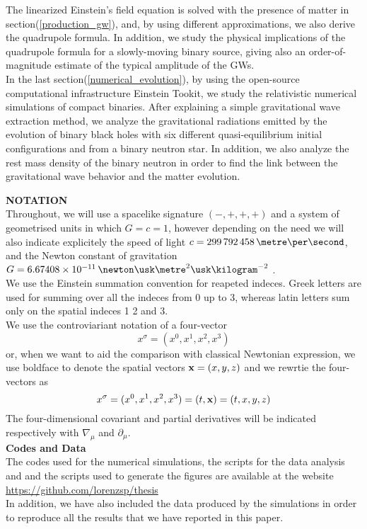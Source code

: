 The linearized Einstein's field equation is solved with the presence of matter in section(\ref{production_gw}), and, by using different approximations, we also derive the quadrupole formula. 
In addition, we study the physical implications of the quadrupole formula for a slowly-moving binary source, giving also an order-of-magnitude estimate of the typical amplitude of the GWs.\\
In the last section(\ref{numerical_evolution}), by using the open-source computational infrastructure Einstein Tookit\cite{loffler_einstein_2012}, we study the relativistic numerical simulations of compact binaries.
After explaining a simple gravitational wave extraction method, we analyze the gravitational radiations emitted by the evolution of binary black holes with six different quasi-equilibrium initial configurations and from a binary neutron star.
In addition, we also analyze the rest mass density of the binary neutron in order to find the link between the gravitational wave behavior and the matter evolution.

\textbf{NOTATION}\\
Throughout, we will use a spacelike signature $(-,+,+,+)$ and a system of geometrised units in which $G=c=1$, however depending on the need we will also indicate explicitely the speed of light $c=299\,792\,458 \,\metre \per \second$, and the Newton constant of gravitation $G=6.67408 \times 10^{-11} \, \newton \usk \metre^2 \usk \kilogram^{-2}$ \cite{codata_blog_codata_nodate}.\\
We use the Einstein summation convention for  reapeted indeces.
Greek letters are used for summing over all the indeces from 0 up to 3,
whereas latin letters sum only on the spatial indeces 1 2 and 3.\\
We use the controviariant notation of a four-vector
\[
x^{\sigma} = (x^{0},x^{1}, x^{2},x^{3})
\]
or, when we want to aid the comparison with classical Newtonian expression, we use boldface to denote the spatial vectors $\vb{x} =(x,y,z)$ and we rewrtie the four-vectors as 
\[
x^{\sigma} = (x^{0},x^{1}, x^{2},x^{3}) = (t,\vb{x}) = (t,x,y,z)
\]
The four-dimensional covariant and partial derivatives will be indicated respectively with $\nabla _{\mu}$ and $\partial _\mu$.\\

\textbf{Codes and Data}\\
The codes used for the numerical simulations, the scripts for the data analysis and and the scripts used to generate the figures are available at the website
\\
\url{https://github.com/lorenzsp/thesis}
\\
In addition, we have also included the data produced by the simulations in order to reproduce all the results that we have reported in this paper. 
